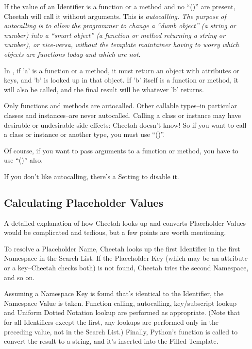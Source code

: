 If the value of an Identifier is a function or a method and no ``()'' are
present, Cheetah will call it without arguments.  This is \em{autocalling}.
The purpose of autocalling is to allow the programmer to change a ``dumb
object'' (a string or number) into a ``smart object'' (a function or method
returning a string or number), or vice-versa, without the template maintainer
having to worry which objects are functions today and which are not.

In , if 'a' is a function or a method, it must return an object
with attributes or keys, and 'b' is looked up in that object.  If 'b'
itself is a function or method, it will also be called, and the final result
will be whatever 'b' returns.

Only functions and methods are autocalled.  Other callable types--in particular
classes and instances--are never autocalled.  Calling a class or instance may
have desirable or undesirable side effects: Cheetah doesn't know!  So if you 
want to call a class or instance or another type, you must use ``()''.

Of course, if you want to pass arguments to a function or method, you have to
use ``()'' also.

If you don't like autocalling, there's a Setting to disable it.


\subsection{Calculating Placeholder Values}

A detailed explanation of how Cheetah looks up and converts Placeholder Values
would be complicated and tedious, but a few points are worth mentioning.

To resolve a Placeholder Name, Cheetah looks up the first Identifier in the
first Namespace in the Search List.  If the Placeholder Key (which may be an
attribute or a key--Cheetah checks both) is not found, Cheetah tries the 
second Namespace, and so on.

Assuming a Namespace Key is found that's identical to the Identifier, the
Namespace Value is taken.  Function calling, autocalling, key/subscript
lookup and Uniform Dotted Notation lookup are performed as appropriate.  (Note
that for all Identifiers except the first, any lookups are performed only in
the preceding value, not in the Search List.)  Finally, Python's 
function is called to convert the result to a string, and it's inserted into
the Filled Template.


